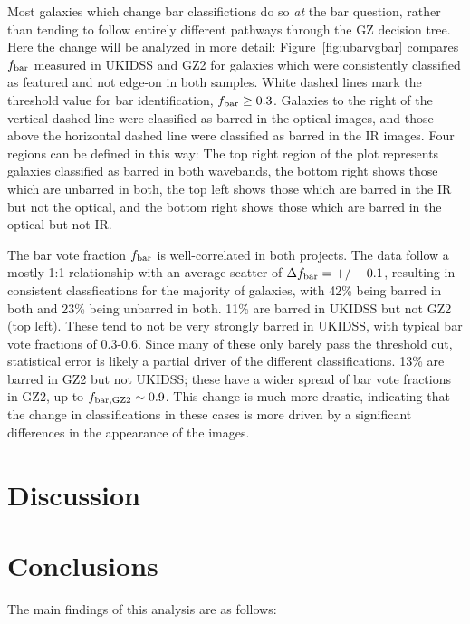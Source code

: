 Most galaxies which change bar classifictions do so \emph{at} the bar question, rather than tending to follow entirely different pathways through the GZ decision tree. Here the change will be analyzed in more detail: Figure~\ref{fig:ubarvgbar} compares $f_{\rm bar}$ measured in UKIDSS and GZ2 for galaxies which were consistently classified as featured and not edge-on in both samples. White dashed lines mark the threshold value for bar identification, $f_{\rm bar}\ge 0.3$. Galaxies to the right of the vertical dashed line were classified as barred in the optical images, and those above the horizontal dashed line were classified as barred in the IR images. Four regions can be defined in this way: The top right region of the plot represents galaxies classified as barred in both wavebands, the bottom right shows those which are unbarred in both, the top left shows those which are barred in the IR but not the optical, and the bottom right shows those which are barred in the optical but not IR.  

The bar vote fraction $f_{\rm bar}$ is well-correlated in both projects. The data follow a mostly 1:1 relationship with an average scatter of $\Delta f_{\rm bar} = +/- 0.1$, resulting in consistent classfications for the majority of galaxies, with 42\% being barred in both and 23\% being unbarred in both. 11\% are barred in UKIDSS but not GZ2 (top left). These tend to not be very strongly barred in UKIDSS, with typical bar vote fractions of 0.3-0.6. Since many of these only barely pass the threshold cut, statistical error is likely a partial driver of the different classifications. 13\% are barred in GZ2 but not UKIDSS; these have a wider spread of bar vote fractions in GZ2, up to $f_{\rm bar,GZ2}\sim0.9$. This change is much more drastic, indicating that the change in classifications in these cases is more driven by a significant differences in the appearance of the images. 

\section{Discussion}

\section{Conclusions}

The main findings of this analysis are as follows:

